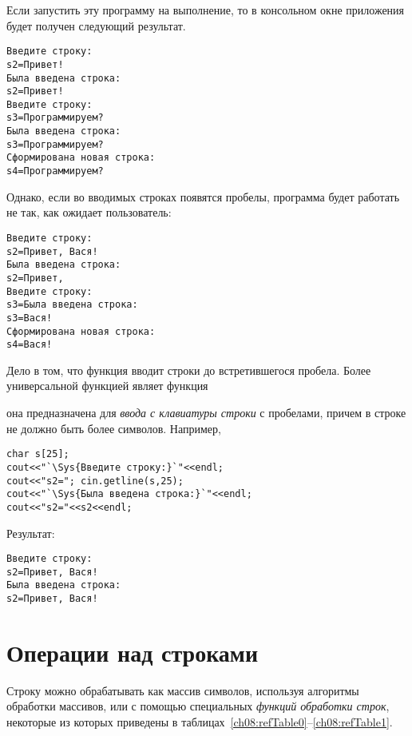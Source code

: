 Если запустить эту программу на выполнение, то в консольном окне приложения будет получен следующий результат.
\begin{verbatim}
Введите строку:
s2=Привет!
Была введена строка:
s2=Привет!
Введите строку:
s3=Программируем?
Была введена строка:
s3=Программируем?
Сформирована новая строка:
s4=Программируем?
\end{verbatim}
Однако, если во вводимых строках появятся пробелы, программа будет работать не так, как ожидает пользователь:
\begin{verbatim}
Введите строку:
s2=Привет, Вася!
Была введена строка:
s2=Привет,
Введите строку:
s3=Была введена строка:
s3=Вася!
Сформирована новая строка:
s4=Вася!
\end{verbatim}
Дело в том, что функция  вводит строки до встретившегося пробела. Более универсальной функцией
являет функция


она предназначена для \emph{ввода с клавиатуры строки}  с пробелами,
причем в строке не должно быть более  символов. Например,
\begin{lstlisting}
char s[25];
cout<<"`\Sys{Введите строку:}`"<<endl;
cout<<"s2="; cin.getline(s,25);
cout<<"`\Sys{Была введена строка:}`"<<endl;
cout<<"s2="<<s2<<endl;
\end{lstlisting}

Результат:
\begin{verbatim}
Введите строку:
s2=Привет, Вася!
Была введена строка:
s2=Привет, Вася!
\end{verbatim}

\section[Операции над строками]{Операции над строками}\label{ch08:2}
Строку можно обрабатывать как массив символов, используя алгоритмы обработки массивов, или с помощью специальных
\emph{функций обработки строк},
некоторые из которых приведены в таблицах~\ref{ch08:refTable0}--\ref{ch08:refTable1}. 

